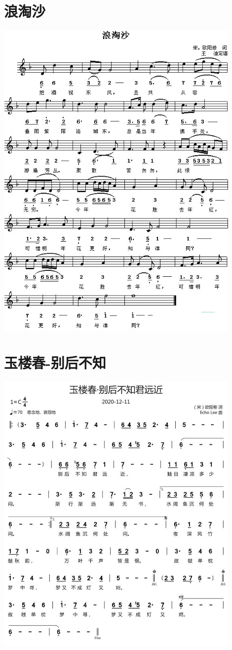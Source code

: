 \documentclass[cn,pad,twocol]{elegantbook}
\begin{document}
\section{浪淘沙} \includegraphics[width=0.9\textwidth]{rpi400/20210212欧阳修-浪淘沙.jpg}
\section{玉楼春-别后不知} \includegraphics[width=0.9\textwidth]{rpi400/20210212欧阳修-玉楼春别后不知君远近.jpg}
\end{document}
